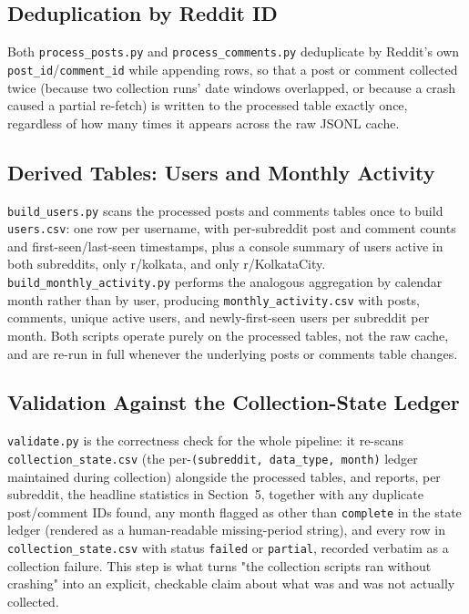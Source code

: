 \documentclass[12pt]{article}
\begin{document}
\subsection{Deduplication by Reddit ID}
Both \texttt{process\_posts.py} and \texttt{process\_comments.py} deduplicate by Reddit's own
\texttt{post\_id}/\texttt{comment\_id} while appending rows, so that a post or comment collected
twice (because two collection runs' date windows overlapped, or because a crash caused a partial
re-fetch) is written to the processed table exactly once, regardless of how many times it appears
across the raw JSONL cache.

\subsection{Derived Tables: Users and Monthly Activity}
\texttt{build\_users.py} scans the processed posts and comments tables once to build
\texttt{users.csv}: one row per username, with per-subreddit post and comment counts and
first-seen/last-seen timestamps, plus a console summary of users active in both subreddits,
only r/kolkata, and only r/KolkataCity. \texttt{build\_monthly\_activity.py} performs the
analogous aggregation by calendar month rather than by user, producing
\texttt{monthly\_activity.csv} with posts, comments, unique active users, and newly-first-seen
users per subreddit per month. Both scripts operate purely on the processed tables, not the raw
cache, and are re-run in full whenever the underlying posts or comments table changes.

\subsection{Validation Against the Collection-State Ledger}
\texttt{validate.py} is the correctness check for the whole pipeline: it re-scans
\texttt{collection\_state.csv} (the per-\texttt{(subreddit, data\_type, month)} ledger maintained
during collection) alongside the processed tables, and reports, per subreddit, the headline
statistics in Section~5, together with any duplicate post/comment IDs found, any month flagged as
other than \texttt{complete} in the state ledger (rendered as a human-readable missing-period
string), and every row in \texttt{collection\_state.csv} with status \texttt{failed} or
\texttt{partial}, recorded verbatim as a collection failure. This step is what turns "the
collection scripts ran without crashing" into an explicit, checkable claim about what was and was
not actually collected.
\end{document}
